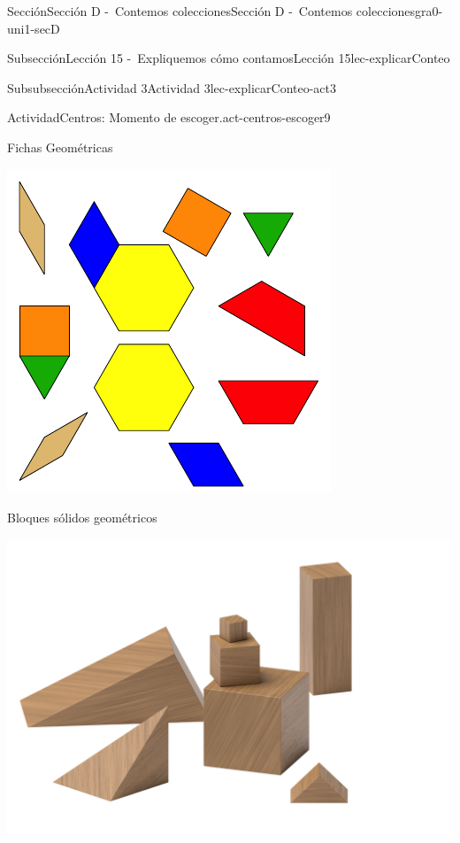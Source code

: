 \documentclass[twoside,10pt,]{article}
\begin{document}
\begin{sectionptx}{Sección}{Sección D -~Contemos colecciones}{}{Sección D -~Contemos colecciones}{}{}{gra0-uni1-secD}
\begin{subsectionptx}{Subsección}{Lección 15 -~Expliquemos cómo contamos}{}{Lección 15}{}{}{lec-explicarConteo}
\begin{subsubsectionptx}{Subsubsección}{Actividad 3}{}{Actividad 3}{}{}{lec-explicarConteo-act3}
\begin{activity}{Actividad}{Centros: Momento de escoger.}{act-centros-escoger9}
\begin{sidebyside}{2}{0.025}{0.025}{0.05}
\begin{sbspanel}{0.45}
\end{sbspanel}%
\begin{sbspanel}{0.45}%
Fichas Geométricas%
\par
\includegraphics[width=\linewidth]{external/svg-source/tikz-file-147344.pdf}
\end{sbspanel}%
\end{sidebyside}%
\begin{sidebyside}{2}{0.025}{0.025}{0.05}%
\begin{sbspanel}{0.45}%
Bloques sólidos geométricos%
\par
\includegraphics[width=\linewidth]{external/png-source/K.1.A Beta Student Workbook.Geoblocks.png}

\end{sbspanel}
\end{sidebyside}
\end{activity}
\end{subsubsectionptx}
\end{subsectionptx}
\end{sectionptx}
\end{document}

